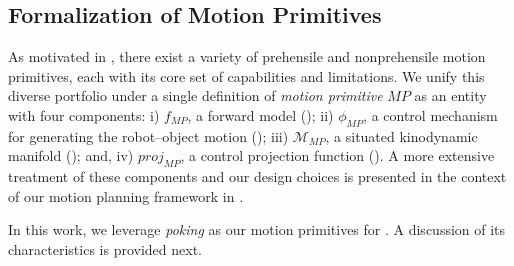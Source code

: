 \subsection{Formalization of Motion Primitives}\label{sec:motion-primitives}

As motivated in , there exist a variety of prehensile and nonprehensile motion primitives, each with its core set of capabilities and limitations.
We unify this diverse portfolio under a single definition of \textsl{motion primitive} $MP$ as an entity with four components: 
i) $f_{MP}$, a forward model (); 
ii) $\phi_{MP}$, a control mechanism for generating the robot--object motion (); 
iii) $\mathcal{M}_{MP}$, a situated kinodynamic manifold (); and, 
iv) $proj_{MP}$, a control projection function ().
A more extensive treatment of these components and our design choices is presented in the context of our motion planning framework in . 


% 
% 

In this work, we leverage \textsl{poking} as our motion primitives for . A discussion of its characteristics is provided next.